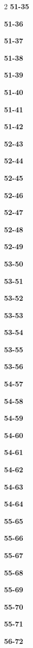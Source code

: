 \documentclass[10pt,a4paper]{article}
\begin{document}
\begin{multicols}{2}
\noindent\textbf{51-35}\ \par
\noindent\textbf{51-36}\ \par
\noindent\textbf{51-37}\ \par
\noindent\textbf{51-38}\ \par
\noindent\textbf{51-39}\ \par
\noindent\textbf{51-40}\ \par
\noindent\textbf{51-41}\ \par
\noindent\textbf{51-42}\ \par
\noindent\textbf{52-43}\ \par
\noindent\textbf{52-44}\ \par
\noindent\textbf{52-45}\ \par
\noindent\textbf{52-46}\ \par
\noindent\textbf{52-47}\ \par
\noindent\textbf{52-48}\ \par
\noindent\textbf{52-49}\ \par
\noindent\textbf{53-50}\ \par
\noindent\textbf{53-51}\ \par
\noindent\textbf{53-52}\ \par
\noindent\textbf{53-53}\ \par
\noindent\textbf{53-54}\ \par
\noindent\textbf{53-55}\ \par
\noindent\textbf{53-56}\ \par
\noindent\textbf{54-57}\ \par
\noindent\textbf{54-58}\ \par
\noindent\textbf{54-59}\ \par
\noindent\textbf{54-60}\ \par
\noindent\textbf{54-61}\ \par
\noindent\textbf{54-62}\ \par
\noindent\textbf{54-63}\ \par
\noindent\textbf{54-64}\ \par
\noindent\textbf{55-65}\ \par
\noindent\textbf{55-66}\ \par
\noindent\textbf{55-67}\ \par
\noindent\textbf{55-68}\ \par
\noindent\textbf{55-69}\ \par
\noindent\textbf{55-70}\ \par
\noindent\textbf{55-71}\ \par
\noindent\textbf{56-72}\ \par

\end{multicols}
\end{document}
